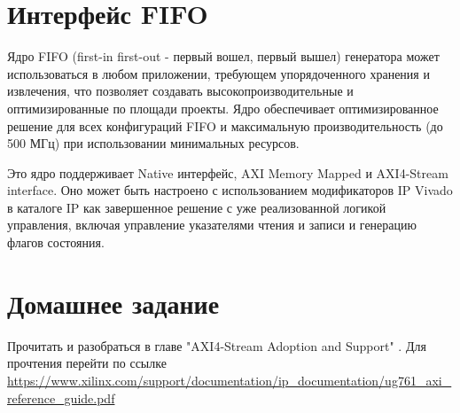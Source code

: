 



\section{Интерфейс FIFO}

Ядро FIFO (first-in first-out - первый вошел, первый вышел) генератора может использоваться в любом приложении, требующем упорядоченного
хранения и извлечения, что позволяет создавать высокопроизводительные и оптимизированные по площади проекты.
Ядро обеспечивает оптимизированное решение для всех конфигураций FIFO и  максимальную производительность (до 500 МГц) при использовании
минимальных ресурсов.

Это ядро поддерживает Native интерфейс, AXI Memory Mapped и AXI4-Stream interface.
Оно может быть настроено с использованием модификаторов IP Vivado в каталоге
IP как завершенное решение с уже реализованной логикой управления, включая управление указателями
чтения и записи и генерацию флагов состояния.

\section{Домашнее задание}

 Прочитать и разобраться в главе  "AXI4-Stream Adoption and Support" .  Для прочтения перейти по ссылке  \url{https://www.xilinx.com/support/documentation/ip_documentation/ug761_axi_reference_guide.pdf}


